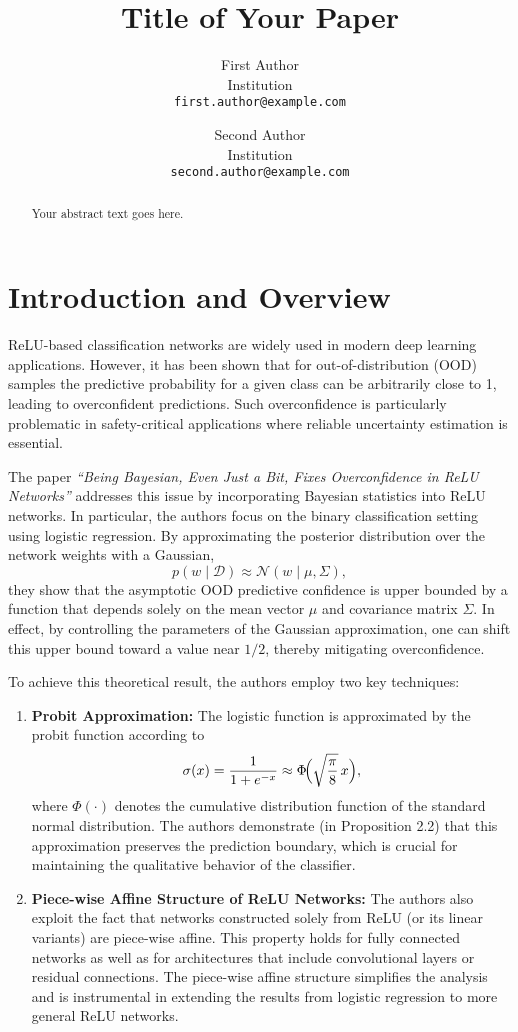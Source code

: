 \documentclass{article} %
\title{Title of Your Paper}
\author{%
  First Author \\
  Institution \\
  \texttt{first.author@example.com}
  \and
  Second Author \\
  Institution \\
  \texttt{second.author@example.com}
}
\begin{document}
\maketitle

\begin{abstract}
Your abstract text goes here. 
\end{abstract}


\section{Introduction and Overview}

ReLU-based classification networks are widely used in modern deep learning applications. However, it has been shown that for out-of-distribution (OOD) samples the predictive probability for a given class can be arbitrarily close to 1, leading to overconfident predictions. Such overconfidence is particularly problematic in safety-critical applications where reliable uncertainty estimation is essential.

The paper \emph{``Being Bayesian, Even Just a Bit, Fixes Overconfidence in ReLU Networks''} addresses this issue by incorporating Bayesian statistics into ReLU networks. In particular, the authors focus on the binary classification setting using logistic regression. By approximating the posterior distribution over the network weights with a Gaussian,
\[
p(w \mid \mathcal{D}) \approx \mathcal{N}(w \mid \mu, \Sigma),
\]
they show that the asymptotic OOD predictive confidence is upper bounded by a function that depends solely on the mean vector \(\mu\) and covariance matrix \(\Sigma\). In effect, by controlling the parameters of the Gaussian approximation, one can shift this upper bound toward a value near \(1/2\), thereby mitigating overconfidence.

To achieve this theoretical result, the authors employ two key techniques:

\begin{enumerate}
    \item \textbf{Probit Approximation:}  
    The logistic function is approximated by the probit function according to
    \[
    \sigma(x) = \frac{1}{1 + e^{-x}} \approx \Phi\!\Bigl(\sqrt{\frac{\pi}{8}}\, x\Bigr),
    \]
    where \(\Phi(\cdot)\) denotes the cumulative distribution function of the standard normal distribution. The authors demonstrate (in Proposition 2.2) that this approximation preserves the prediction boundary, which is crucial for maintaining the qualitative behavior of the classifier.
    
    \item \textbf{Piece-wise Affine Structure of ReLU Networks:}  
    The authors also exploit the fact that networks constructed solely from ReLU (or its linear variants) are piece-wise affine. This property holds for fully connected networks as well as for architectures that include convolutional layers or residual connections. The piece-wise affine structure simplifies the analysis and is instrumental in extending the results from logistic regression to more general ReLU networks.
\end{enumerate}
\end{document}

